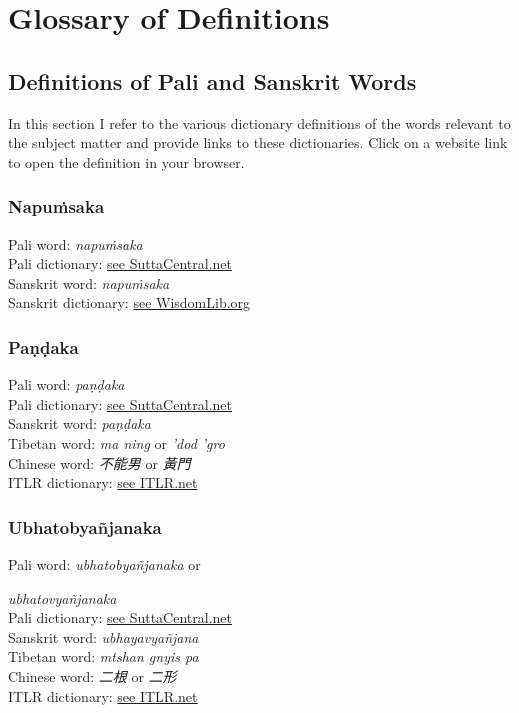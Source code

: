 \section{Glossary of Definitions}
\label{appendix3}

\subsection{Definitions of Pali and Sanskrit Words}
In this section I refer to the various dictionary definitions of the words relevant to the subject matter and provide links to these dictionaries. Click on a website link to open the definition in your browser.

\begin{multicols}{2}
\subsubsection*{Napuṁsaka}
Pali word: \textit{napuṁsaka}\\
Pali dictionary: \href{https://suttacentral.net/define/napu%E1%B9%83saka}{see SuttaCentral.net}\\
Sanskrit word: \textit{napuṁsaka}\\
Sanskrit dictionary: \href{https://www.wisdomlib.org/definition/napumsaka}{see WisdomLib.org}
\medskip

\subsubsection*{Paṇḍaka}
Pali word: \textit{paṇḍaka}\\
Pali dictionary: \href{https://suttacentral.net/define/pa%E1%B9%87%E1%B8%8Daka}{see SuttaCentral.net}\\
Sanskrit word: \textit{paṇḍaka}\\
Tibetan word: \textit{ma ning} or \textit{'dod 'gro}\\
Chinese word: \textit{不能男} or \textit{黃門}\\
ITLR dictionary: \href{http://www.itlr.net/hwid:281142}{see ITLR.net}
\medskip

\subsubsection*{Ubhatob­yañ­janaka}
Pali word: \textit{ubhatob­yañ­janaka} or 

\textit{ubhatovyañ­janaka}\\
Pali dictionary: \href{https://suttacentral.net/define/ubhatovya%C3%B1janaka}{see SuttaCentral.net}\\
Sanskrit word: \textit{ubhayavyañjana}\\
Tibetan word: \textit{mtshan gnyis pa}\\
Chinese word: \textit{二根} or \textit{二形}\\
ITLR dictionary: \href{http://www.itlr.net/hwid:62844}{see ITLR.net}
\medskip


\end{multicols}
